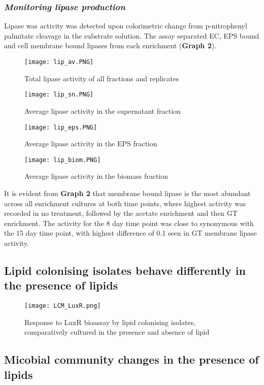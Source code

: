 \documentclass[11pt]{article}
\begin{document}
\subsubsection{\emph{Monitoring lipase production}}
Lipase was activity was detected upon colorimetric change from p-nitrophenyl palmitate cleavage in the substrate solution. The assay separated  EC, EPS bound and cell membrane bound lipases from each enrichment (\textbf{Graph 2}).

\begin{figure}
\texttt{[image: lip\_av.PNG]}
\caption{Total lipase activity of all fractions and replicates}
\end{figure}

\begin{figure}
\texttt{[image: lip\_sn.PNG]}
\caption{Average lipase activity in the supernatant fraction}
\end{figure}

\begin{figure}
\texttt{[image: lip\_eps.PNG]}
\caption{Average lipase activity in the EPS fraction}
\end{figure}

\begin{figure}
\texttt{[image: lip\_biom.PNG]}
\caption{Average lipase activity in the biomass fraction}
\end{figure}



It is evident from  \textbf{Graph 2} that membrane bound lipase is the most abundant across all enrichment cultures at both time points, where highest activity was recorded in no treatment, followed by the acetate enrichment and then GT enrichment.  The activity for the 8 day time point was close to synonymous with the 15 day time point, with highest difference of 0.1 seen in GT membrane lipase activity.

\subsection{Lipid colonising isolates behave differently in the presence of lipids}

\begin{figure}
\texttt{[image: LCM\_LuxR.png]}
\caption{Response to LuxR bioassay by lipid colonising isolates, comparatively cultured in the presence and absence of lipid }
\end{figure}


\subsection{Micobial community changes in the presence of lipids}
\end{document}
